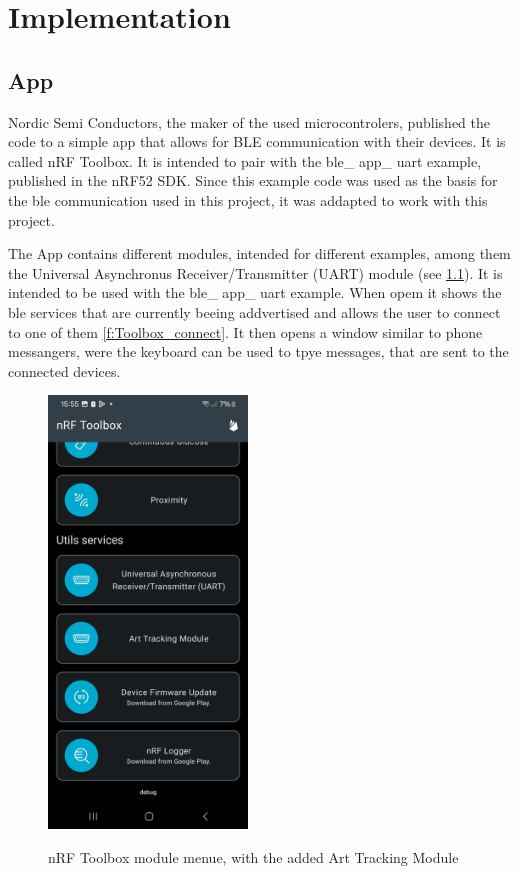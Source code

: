 \chapter{Implementation}

\section{App}
Nordic Semi Conductors, the maker of the used microcontrolers, published the code to a simple app that allows for BLE communication with their devices.
It is called nRF Toolbox.
It is intended to pair with the ble\_ app\_ uart example, published in the nRF52 SDK.
Since this example code was used as the basis for the ble communication used in this project, it was addapted to work with this project.


The App contains different modules, intended for different examples, among them the Universal Asynchronus Receiver/Transmitter (UART) module (see \ref{f:Toolbox_modules}).
It is intended to be used with the ble\_ app\_ uart example.
When opem it shows the ble services that are currently beeing addvertised and allows the user to connect to one of them \ref{f:Toolbox_connect}.
It then opens a window similar to phone messangers, were the keyboard can be used to tpye messages, that are sent to the connected devices.

\begin{figure}[ht!]
\centering
 \caption{nRF Toolbox module menue, with the added Art Tracking Module}
\includegraphics[width=200px]{graphics/nRF_toolbox_modules.jpg}
\label{f:Toolbox_modules}
\end{figure}


